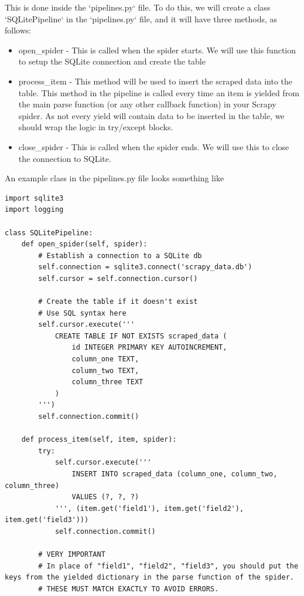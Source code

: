 \documentclass[8pt]{extarticle}
\begin{document}
\begin{multicols}{3}
This is done inside the `pipelines.py` file. To do this, we will create a class `SQLitePipeline` in the `pipelines.py` file, and it will have three methods, as follows:
\begin{itemize}
    \item open\_spider - This is called when the spider starts. We will use this function to setup the SQLite connection and create the table
    \item process\_item - This method will be used to insert the scraped data into the table. This method in the pipeline is called every time an item is yielded from the main parse function (or any other callback function) in your Scrapy spider. As not every yield will contain data to be inserted in the table, we should wrap the logic in try/except blocks.
    \item close\_spider - This is called when the spider ends. We will use this to close the connection to SQLite.
\end{itemize}

An example class in the pipelines.py file looks something like

\begin{lstlisting}[style=python]     
import sqlite3
import logging

class SQLitePipeline:
    def open_spider(self, spider):
        # Establish a connection to a SQLite db
        self.connection = sqlite3.connect('scrapy_data.db')
        self.cursor = self.connection.cursor()

        # Create the table if it doesn't exist
        # Use SQL syntax here 
        self.cursor.execute('''
            CREATE TABLE IF NOT EXISTS scraped_data (
                id INTEGER PRIMARY KEY AUTOINCREMENT,
                column_one TEXT,
                column_two TEXT,
                column_three TEXT
            )
        ''')
        self.connection.commit()

    def process_item(self, item, spider):
        try:
            self.cursor.execute('''
                INSERT INTO scraped_data (column_one, column_two, column_three)
                VALUES (?, ?, ?)
            ''', (item.get('field1'), item.get('field2'), item.get('field3')))
            self.connection.commit()

        # VERY IMPORTANT
        # In place of "field1", "field2", "field3", you should put the keys from the yielded dictionary in the parse function of the spider. 
        # THESE MUST MATCH EXACTLY TO AVOID ERRORS.


\end{lstlisting}
\end{multicols}
\end{document}
